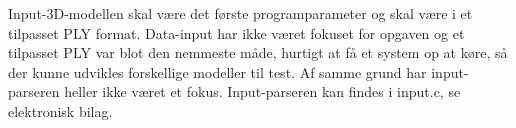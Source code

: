 Input-3D-modellen skal være det første programparameter og skal være i et tilpasset PLY format. Data-input har ikke været fokuset for opgaven og et tilpasset PLY var blot den nemmeste måde, hurtigt at få et system op at køre, så der kunne udvikles forskellige modeller til test. Af samme grund har input-parseren heller ikke været et fokus. Input-parseren kan findes i input.c, se elektronisk bilag. 